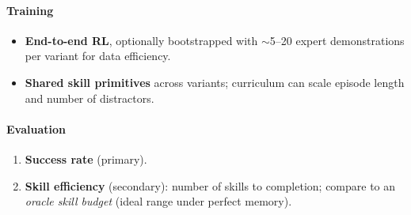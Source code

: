 \paragraph{Training}
\begin{itemize}[itemsep=2pt, topsep=2pt, leftmargin=12pt]
  \item \textbf{End-to-end RL}, optionally bootstrapped with $\sim$5--20 expert demonstrations per variant for data efficiency.
  \item \textbf{Shared skill primitives} across variants; curriculum can scale episode length and number of distractors.
\end{itemize}

\paragraph{Evaluation}
\begin{enumerate}[itemsep=2pt, topsep=2pt, leftmargin=14pt]
  \item \textbf{Success rate} (primary).
  \item \textbf{Skill efficiency} (secondary): number of skills to completion; compare to an \emph{oracle skill budget} (ideal range under perfect memory).
\end{enumerate}
